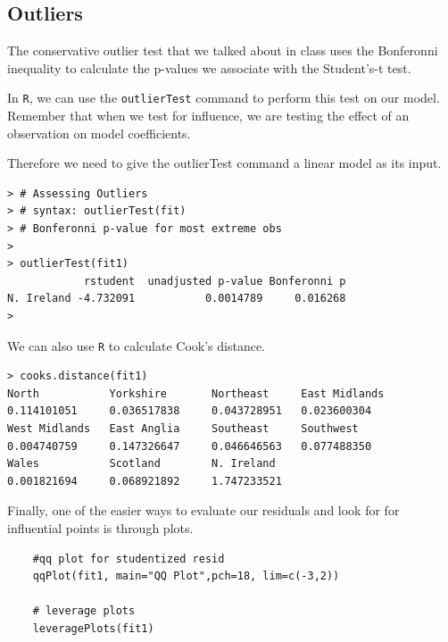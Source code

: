 \documentclass[residuals.tex]{subfiles}
\begin{document}
\newpage
\subsection*{Outliers}




The conservative outlier test that we talked about in class uses the
Bonferonni inequality to calculate the p-values we associate with the
Student's-t test. 

In \texttt{R}, we can use the \texttt{outlierTest} command to perform this
test on our model. Remember that when we test for influence, we are testing
the effect of an observation on model coefficients. 

Therefore we need to
give the outlierTest command a linear model as its input.
\begin{framed}
	\begin{verbatim}
> # Assessing Outliers
> # syntax: outlierTest(fit) 
> # Bonferonni p-value for most extreme obs
>
> outlierTest(fit1)
            rstudent  unadjusted p-value Bonferonni p
N. Ireland -4.732091           0.0014789     0.016268
> 
\end{verbatim}
\end{framed}
\noindent We can also use \texttt{R} to calculate Cook's distance. 
\begin{framed}
\begin{verbatim}
> cooks.distance(fit1)
North           Yorkshire       Northeast     East Midlands 
0.114101051     0.036517838     0.043728951   0.023600304 
West Midlands   East Anglia     Southeast     Southwest 
0.004740759     0.147326647     0.046646563   0.077488350 
Wales           Scotland        N. Ireland 
0.001821694     0.068921892     1.747233521 
\end{verbatim}
\end{framed}

Finally, one of the easier ways to evaluate our residuals and look for
for influential points is through plots. 

\begin{framed}
	\begin{verbatim}
	#qq plot for studentized resid 
	qqPlot(fit1, main="QQ Plot",pch=18, lim=c(-3,2)) 
	
	# leverage plots
	leveragePlots(fit1) 
	\end{verbatim}
\end{framed}
\end{document}
